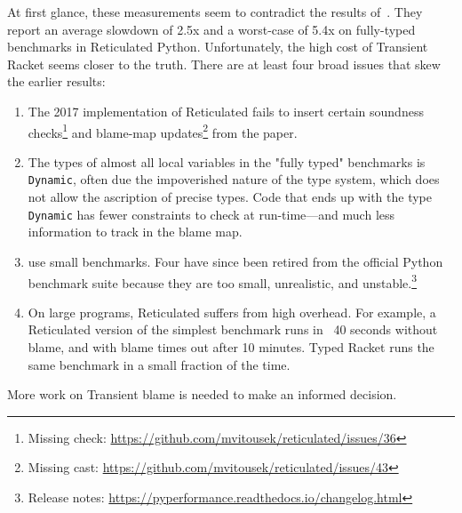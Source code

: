 At first glance, these measurements seem to contradict the results
of~\citet{vss-popl-2017}. They report an average slowdown of 2.5x and a
worst-case of 5.4x on fully-typed benchmarks in Reticulated Python.
Unfortunately, the high cost of Transient Racket seems closer to the truth.
There are at least four broad issues that skew the earlier results:
\begin{enumerate}

\item The 2017 implementation of Reticulated fails to insert certain soundness
checks\footnote{Missing check:
\url{https://github.com/mvitousek/reticulated/issues/36}} and blame-map
updates\footnote{Missing cast:
\url{https://github.com/mvitousek/reticulated/issues/43}} from the paper.

\item The types of almost all local variables in the "fully typed" benchmarks is
{\tt Dynamic}, often due the impoverished nature of the type system, which does
not allow the ascription of precise types.  Code that ends up with the type {\tt
Dynamic} has fewer constraints to check at run-time---and much less information
to track in the blame map.

\item \citet{vss-popl-2017} use small benchmarks.  Four have since been retired
from the official Python benchmark suite because they are too small,
unrealistic, and unstable.\footnote{Release notes:
\url{https://pyperformance.readthedocs.io/changelog.html}}

\item On large programs, Reticulated suffers from high overhead.  For example, a
Reticulated version of the simplest benchmark runs in ~40 seconds without blame,
and with blame times out after 10 minutes. Typed Racket runs the same benchmark
in a small fraction of the time.
\end{enumerate}
More work on Transient blame is needed to make an informed decision. 


